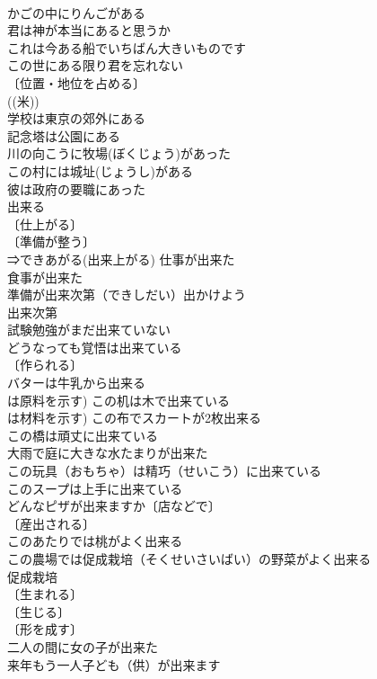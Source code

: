 \documentclass[8pt]{extreport}
\begin{document}
\begin{CJK}{UTF8}{min}
\\	かごの中にりんごがある 
\\	君は神が本当にあると思うか 
\\	これは今ある船でいちばん大きいものです 
\\	この世にある限り君を忘れない 
\\	〔位置・地位を占める〕
\\	((米)) 
\\	学校は東京の郊外にある 
\\	記念塔は公園にある 
\\	川の向こうに牧場(ぼくじょう)があった 
\\	この村には城址(じょうし)がある 
\\	彼は政府の要職にあった 
\\	出来る	
\\	〔仕上がる〕
\\	〔準備が整う〕
\\	⇒できあがる(出来上がる) 仕事が出来た 
\\	食事が出来た 
\\	準備が出来次第（できしだい）出かけよう 
\\	出来次第　
\\	試験勉強がまだ出来ていない 
\\	どうなっても覚悟は出来ている 
\\	〔作られる〕
\\	バターは牛乳から出来る 
\\	は原料を示す) この机は木で出来ている 
\\	は材料を示す) この布でスカートが2枚出来る 
\\	この橋は頑丈に出来ている 
\\	大雨で庭に大きな水たまりが出来た 
\\	この玩具（おもちゃ）は精巧（せいこう）に出来ている 
\\	このスープは上手に出来ている 
\\	どんなピザが出来ますか〔店などで〕 
\\	〔産出される〕
\\	このあたりでは桃がよく出来る 
\\	この農場では促成栽培（そくせいさいばい）の野菜がよく出来る 
\\	促成栽培　　
\\	〔生まれる〕
\\	〔生じる〕
\\	〔形を成す〕
\\	二人の間に女の子が出来た 
\\	来年もう一人子ども（供）が出来ます 

\end{CJK}
\end{document}
